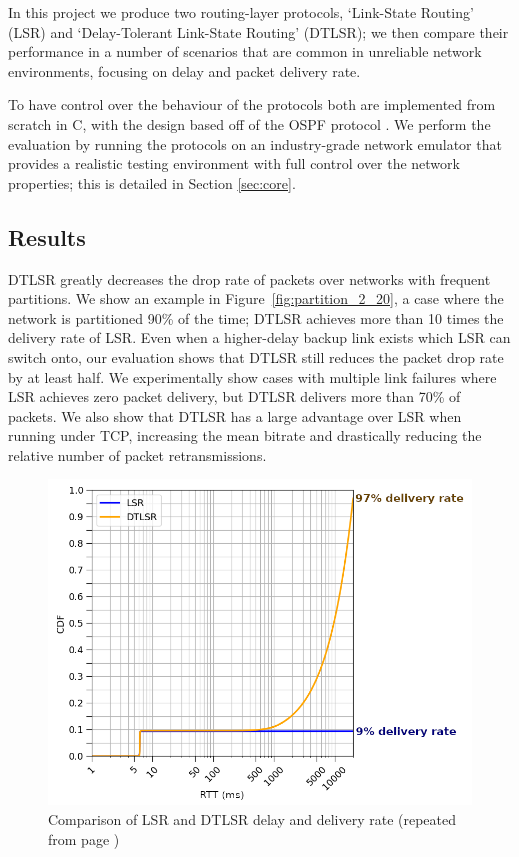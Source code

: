 \documentclass[withindex,glossary,openany]{cam-thesis}
\newcommand{\repeatcaption}[2]{%
  \renewcommand{\thefigure}{\ref{#1}}%
  \captionsetup{list=no}%
  \caption{#2 (repeated from page \pageref{#1})}%
  \addtocounter{figure}{-1}%
}
\begin{document}
In this project we produce two routing-layer protocols, `Link-State Routing' (LSR) and `Delay-Tolerant Link-State Routing' (DTLSR); we then compare their performance in a number of scenarios that are common in unreliable network environments, focusing on delay and packet delivery rate.

To have control over the behaviour of the protocols both are implemented from scratch in C, with the design based off of the OSPF protocol \cite{OSPF}. We perform the evaluation by running the protocols on an industry-grade network emulator \cite{CORE} that provides a realistic testing environment with full control over the network properties; this is detailed in Section \ref{sec:core}.

\subsection{Results}

\begin{minipage}{1\textwidth}

DTLSR greatly decreases the drop rate of packets over networks with frequent partitions. We show an example in Figure~\ref{fig:partition_2_20}, a case where the network is partitioned 90\% of the time; DTLSR achieves more than 10 times the delivery rate of LSR. Even when a higher-delay backup link exists which LSR can switch onto, our evaluation shows that DTLSR still reduces the packet drop rate by at least half. We experimentally show cases with multiple link failures where LSR achieves zero packet delivery, but DTLSR delivers more than 70\% of packets. We also show that DTLSR has a large advantage over LSR when running under TCP, increasing the mean bitrate and drastically reducing the relative number of packet retransmissions.

\begin{figure}[H]
  \centering
  \hspace*{2.4cm}
  \includegraphics[width=0.8\linewidth]{delay_partition_flap2_20}
  \repeatcaption{fig:partition_2_20}{Comparison of LSR and DTLSR delay and delivery rate}
\end{figure}

\end{minipage}
\end{document}
